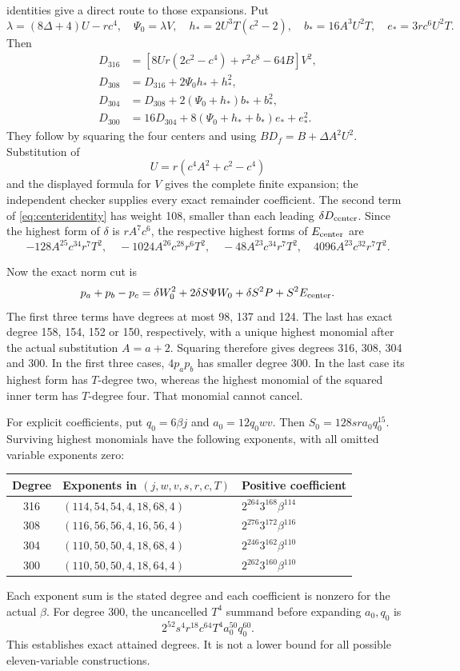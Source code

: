 identities give a direct route to those expansions. Put
\[
 \lambda=(8\Delta+4)U-rc^4,\quad \Psi_0=\lambda V,\quad
 h_*=2U^3T(c^2-2),\quad b_*=16A^3U^2T,\quad e_*=3rc^6U^2T.
\]
Then
\begin{align*}
 D_{316}&=[8Ur(2c^2-c^4)+r^2c^8-64B]V^2,\\
 D_{308}&=D_{316}+2\Psi_0h_*+h_*^2,\\
 D_{304}&=D_{308}+2(\Psi_0+h_*)b_*+b_*^2,\\
 D_{300}&=16D_{304}+8(\Psi_0+h_*+b_*)e_*+e_*^2.
\end{align*}
They follow by squaring the four centers and using
$BD_f=B+\Delta A^2U^2$. Substitution of
\[
 U=r(c^4A^2+c^2-c^4)
\]
and the displayed formula for $V$ gives the complete finite expansion;
the independent checker supplies every exact remainder coefficient.
The second term of \eqref{eq:centeridentity} has weight 108, smaller than
each leading $\delta D_{\rm center}$. Since the highest form of
$\delta$ is $rA^7c^6$, the respective highest forms of $E_{\rm center}$ are
\[
 -128A^{25}c^{34}r^7T^2,\quad
 -1024A^{26}c^{28}r^6T^2,\quad
 -48A^{23}c^{34}r^7T^2,\quad
 4096A^{23}c^{32}r^7T^2.
\]

Now the exact norm cut is
\begin{equation}\label{eq:normcut}
 p_a+p_b-p_c=\delta W_0^2+2\delta S\Psi W_0+
             \delta S^2P+S^2E_{\rm center}.
\end{equation}
The first three terms have degrees at most 98, 137 and 124.
The last has exact degree 158, 154, 152 or 150, respectively, with a
unique highest monomial after the actual substitution $A=a+2$.
Squaring therefore gives degrees 316, 308, 304 and 300. In the first
three cases, $4p_ap_b$ has smaller degree 300. In the last case its highest
form has $T$-degree two, whereas the highest monomial of the squared inner
term has $T$-degree four. That monomial cannot cancel.

For explicit coefficients, put $q_0=6\beta j$ and $a_0=12q_0wv$.
Then $S_0=128sra_0q_0^{15}$. Surviving highest monomials have the following
exponents, with all omitted variable exponents zero:
\begin{center}\small
\begin{tabular}{@{}cll@{}}\toprule
Degree & Exponents in $(j,w,v,s,r,c,T)$ & Positive coefficient\\\midrule
316&$(114,54,54,4,18,68,4)$&$2^{264}3^{168}\beta^{114}$\\
308&$(116,56,56,4,16,56,4)$&$2^{276}3^{172}\beta^{116}$\\
304&$(110,50,50,4,18,68,4)$&$2^{246}3^{162}\beta^{110}$\\
300&$(110,50,50,4,18,64,4)$&$2^{262}3^{160}\beta^{110}$\\\bottomrule
\end{tabular}
\end{center}
Each exponent sum is the stated degree and each coefficient is nonzero
for the actual $\beta$. For degree 300, the uncancelled $T^4$ summand before
expanding $a_0,q_0$ is
\[
 2^{52}s^4r^{18}c^{64}T^4a_0^{50}q_0^{60}.
\]
This establishes exact attained degrees. It is not a lower bound for all
possible eleven-variable constructions.

